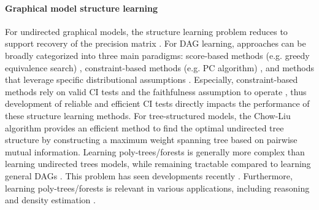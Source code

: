 \documentclass{article}
\theoremstyle{definition}
\theoremstyle{definition}
\theoremstyle{definition}
\theoremstyle{definition}
\theoremstyle{definition}
\theoremstyle{definition}
\theoremstyle{remark}
\theoremstyle{remark}
\begin{document}
\paragraph{Graphical model structure learning}
For undirected graphical models, the structure learning problem reduces to support recovery of the precision matrix \citep{meinshausen2006high,friedman2008sparse,cai2011constrained,liu2009nonparanormal}. 
For DAG learning, approaches can be broadly categorized into three main paradigms: score-based methods (e.g. greedy equivalence search) \citep{chickering2002optimal,nandy2018high}, constraint-based methods (e.g. PC algorithm) \citep{spirtes1991algorithm,friedman2013learning}, and methods that leverage specific distributional assumptions \citep{shimizu2006linear,hoyer2008nonlinear,peters2011identifiability,peters2014causal,peters2014identifiability}.
Especially, constraint-based methods rely on valid CI tests and the faithfulness assumption to operate \citep{kalisch2007estimating,marx2021weaker}, thus development of reliable and efficient CI tests directly impacts the performance of these structure learning methods.
For tree-structured models, the Chow-Liu algorithm \citep{chow1968approximating, chow1973consistency} provides an efficient method to find the optimal undirected tree structure by constructing a maximum weight spanning tree based on pairwise mutual information. 
Learning poly-trees/forests is generally more complex than learning undirected trees models, while remaining tractable compared to learning general DAGs \citep{rebane1987recovery,srebro2003maximum,tan2010learning,tan2011learning}. 
This problem has seen developments recently \citep{gao2021efficient,azadkia2021fast,jakobsen2022structure}.
Furthermore, learning poly-trees/forests is relevant in various applications, including reasoning and density estimation \citep{kim1983computational,liu2011forest}. 



\vspace{-0.5em}
\end{document}
